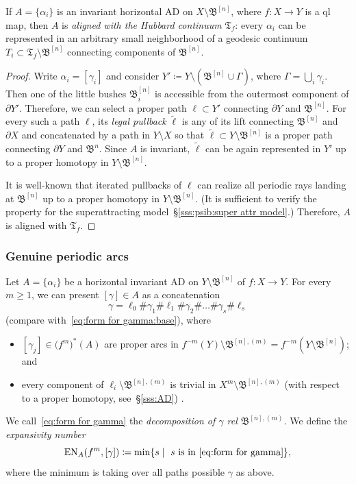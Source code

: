 \documentclass{amsart}
\newcommand{\Hub}{{\mathfrak T}}
\newcommand{\ExpN}{{\operatorname{EN}}}
\newcommand{\bush}{{\mathfrak B }}
\newcommand{\bbush}{{\boldsymbol {\mathfrak B} }}
\newcommand{\1}{{\mathbb 1 }}
\begin{document}
\begin{lem}[Alignment with $\Hub_f$, following~{\cite[\S4]{K}}]\label{lem:Alignment}
If $A=\{\alpha_i\}$ is an invariant horizontal AD on $X\setminus \bbush^{[n]}$, where $f\colon X\to Y$ is a ql map, then $A$ is \emph{aligned with the Hubbard continuum} $\Hub_f$: every $\alpha_i$ can be represented in an arbitrary small neighborhood of a geodesic continuum $T_i\subset \Hub_f\setminus \bbush^{[n]}$ connecting components of $\bbush^{[n]}$.
\end{lem}
\begin{proof}
Write $\alpha_i=[\gamma_i]$ and consider $Y'\coloneqq Y\setminus \left(\bbush^{[n]}\cup  \Gamma \right)$, where $\Gamma=\bigcup_i \gamma_i$. Then one of the little bushes $\bush^{[n]}_i$ is accessible from the outermost component of $\partial Y'$. Therefore, we can select a proper path $\ell \subset Y'$ connecting $\partial Y$ and $\bbush^{[n]}$. For every such a path $\ell$, its \emph{legal pullback} $\widetilde \ell$ is any of its lift connecting $\bbush^{[n]}$ and $\partial X$ and concatenated by a path in $Y\setminus X$ so that $\widetilde \ell\subset Y\setminus \bbush^{[n]}$ is a proper path connecting $\partial Y$ and $\bbush^{n}$. Since $A$ is invariant, $\widetilde \ell$ can be again represented in $Y'$ up to a proper homotopy in $Y\setminus \bbush^{[n]}$.


It is well-known that iterated pullbacks of $\ell$ can realize all periodic rays landing at $\bbush^{[n]}$ up to a proper homotopy in $Y\setminus \bbush^{[n]}$. (It is sufficient to verify the property for the superattracting model~\S\ref{sss:psib:super attr model}.)  Therefore, $A$ is aligned with $\Hub_f$.
\end{proof}

\subsubsection{Genuine periodic arcs} \label{sss:periodic arcs}Let $A=\{\alpha_i\}$ be a horizontal invariant AD on $Y\setminus \bbush^{[n]}$ of $f\colon X\to Y$. For every $m\ge 1$, we can present $[\gamma]\in A$ as a concatenation
\begin{equation}
\label{eq:form for gamma}
\gamma = \ell_0\#\gamma_1\# \ell_1 \#\gamma_2\# \dots \#\gamma_s\#\ell_s
\end{equation}
(compare with~\eqref{eq:form for gamma:base}), where 
\begin{itemize}
\item $[\gamma_j]\in\big( f^{m}\big)^*(A)$ are proper arcs in $f^{-m}(Y)\setminus \bbush^{[n],(m)}=f^{-m}\left(Y\setminus \bbush^{[n]}\right)$; and
\item every component of $\ell_i\setminus \bbush^{[n],(m)}$ is trivial in $X^m\setminus \bbush^{[n],(m)}$  (with respect to a proper homotopy, see~\S\ref{sss:AD}) .
\end{itemize}
We call~\eqref{eq:form for gamma} the \emph{decomposition of $\gamma$ rel $\bbush^{[n],(m)}$.}  We define the \emph{expansivity number} \[\ExpN_A(f^m, [\gamma])\coloneqq \min \{s \mid \ s \text{ is in \eqref{eq:form for gamma}}\},\]
where the minimum is taking over all paths possible $\gamma$ as above.
 
\end{document}
